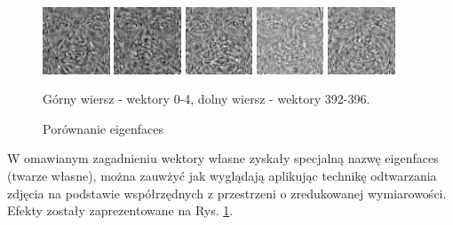 \documentclass[oneside, eng]{mgr}
\begin{document}
\begin{figure}
	\begin{minipage}{2cm}
		\includegraphics[width=2cm]{img/392.jpg}
	\end{minipage}
	\begin{minipage}{2cm}
		\includegraphics[width=2cm]{img/393.jpg}
	\end{minipage}
	\begin{minipage}{2cm}
		\includegraphics[width=2cm]{img/394.jpg}
	\end{minipage}
	\begin{minipage}{2cm}
		\includegraphics[width=2cm]{img/395.jpg}
	\end{minipage}
	\begin{minipage}{2cm}
		\includegraphics[width=2cm]{img/396.jpg}
	\end{minipage}
	\caption{Porównanie eigenfaces}
Górny wiersz - wektory 0-4, dolny wiersz - wektory 392-396.
	\label{fig:eigenfaces}
\end{figure}

W omawianym zagadnieniu wektory własne zyskały specjalną nazwę eigenfaces (twarze własne), można zauwżyć jak wyglądają aplikując technikę odtwarzania zdjęcia na podstawie współrzędnych z przestrzeni o zredukowanej wymiarowości. Efekty zostały zaprezentowane na Rys. \ref{fig:eigenfaces}. 
\end{document}
